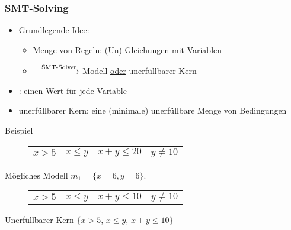 \begin{frame}
	\frametitle{\color{white}SMT-Solving}
	
	\begin{itemize}
		\item Grundlegende Idee: 
			\begin{itemize}
				\item[] Menge von Regeln: (Un)-Gleichungen mit Variablen
				\item[] \qquad$\>\>$ $\xrightarrow{\text{SMT-Solver}}$ Modell \underline{oder} unerf\"ullbarer Kern
			\end{itemize}		
		\item {}: einen Wert f\"ur jede Variable
		\item \color{blue}unerf\"ullbarer Kern\color{black}: eine (minimale) unerf\"ullbare Menge von Bedingungen
	\end{itemize}
	\begin{exampleblock}{Beispiel}
		\begin{figure}[H]
			\centering
			\begin{tabular}{cccc}
				$x > 5 $ & $x \le y$ & $ x+ y \le 20$ &$y \neq 10$ \\
			\end{tabular}
		\end{figure}
		M\"ogliches Modell $m_1 = \{x=6, y=6\}$.
		\begin{figure}[H]
			\centering
			\begin{tabular}{cccc}
				$x > 5 $ & $x \le y$ & $ x+ y \le 10$ &$y \neq 10$ \\
			\end{tabular}
		\end{figure}
		Unerf\"ullbarer Kern $\{x > 5$, $x \le y$,  $x+ y \le 10 \}$
	\end{exampleblock}
\end{frame}